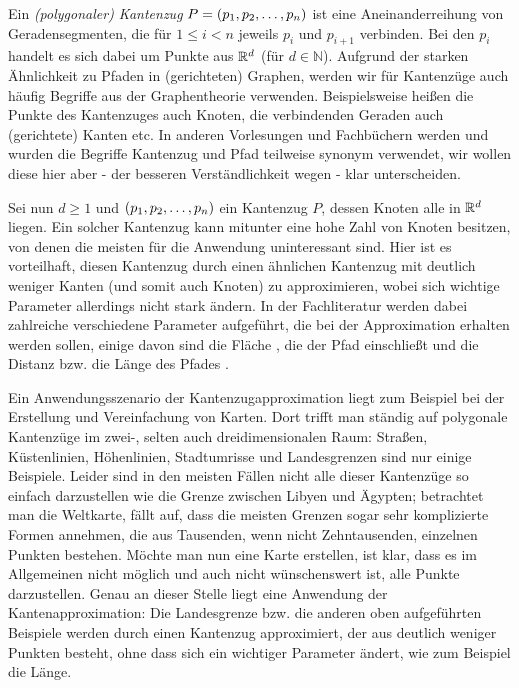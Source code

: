 	Ein \emph{(polygonaler) Kantenzug} $P = (p_1, p_2, \mathellipsis, p_n)$ ist eine Aneinanderreihung von Geradensegmenten, die für $1 \leq i < n$ jeweils $p_i$ und $p_{i+1}$ verbinden. 
	Bei den $p_i$ handelt es sich dabei um Punkte aus $\mathbb{R}^d$ (für $d \in \mathbb{N}$). Aufgrund der starken Ähnlichkeit zu Pfaden in (gerichteten) Graphen, werden wir für Kantenzüge auch häufig Begriffe aus der Graphentheorie verwenden. 
	Beispielsweise heißen die Punkte des Kantenzuges auch Knoten, die verbindenden Geraden auch (gerichtete) Kanten etc.
	In anderen Vorlesungen und Fachbüchern werden und wurden die Begriffe Kantenzug und Pfad teilweise synonym verwendet, wir wollen diese hier aber - der besseren Verständlichkeit wegen -  klar unterscheiden.

    Sei nun $d\geq1$ und $(p_1, p_2, \mathellipsis, p_n)$ ein Kantenzug $P$, dessen Knoten alle in $\mathbb{R}^{d}$ liegen.
    Ein solcher Kantenzug kann mitunter eine hohe Zahl von Knoten besitzen, von denen die meisten für die Anwendung uninteressant sind. 
    Hier ist es vorteilhaft, diesen Kantenzug durch einen ähnlichen Kantenzug mit deutlich weniger Kanten (und somit auch Knoten) zu approximieren, wobei sich wichtige Parameter allerdings nicht stark ändern. 
    In der Fachliteratur werden dabei zahlreiche verschiedene Parameter aufgeführt, die bei der Approximation erhalten werden sollen, einige davon sind die Fläche \cite{bose}, die der Pfad einschließt und die Distanz bzw. die Länge des Pfades \cite{gudmundsson}. 
    
    Ein Anwendungsszenario der Kantenzugapproximation liegt zum Beispiel bei der Erstellung und Vereinfachung von Karten. 
    Dort trifft man ständig auf polygonale Kantenzüge im \mbox{zwei-,} selten auch dreidimensionalen Raum: Straßen, Küstenlinien, Höhenlinien, Stadtumrisse und Landesgrenzen sind nur einige Beispiele. 
    Leider sind in den meisten Fällen nicht alle dieser Kantenzüge so einfach darzustellen wie die Grenze zwischen Libyen und Ägypten; betrachtet man die Weltkarte, fällt auf, dass die meisten Grenzen sogar sehr komplizierte Formen annehmen, die aus Tausenden, wenn nicht Zehntausenden, einzelnen Punkten bestehen.
    Möchte man nun eine Karte erstellen, ist klar, dass es im Allgemeinen nicht möglich und auch nicht wünschenswert ist, alle Punkte darzustellen. 
    Genau an dieser Stelle liegt eine Anwendung der Kantenapproximation: Die Landesgrenze bzw. die anderen oben aufgeführten Beispiele werden durch einen Kantenzug approximiert, der aus deutlich weniger Punkten besteht, ohne dass sich ein wichtiger Parameter ändert, wie zum Beispiel die Länge.
    
